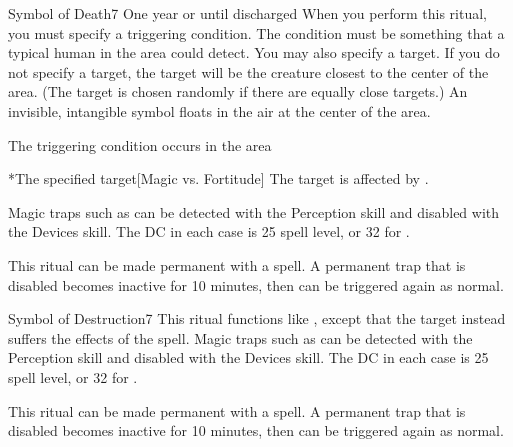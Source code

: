 \begin{spellsection}{Symbol of Death}{7}
\spelldur One year or until discharged
\spellspecial When you perform this ritual, you must specify a triggering condition. The condition must be something that a typical human in the area could detect. You may also specify a target. If you do not specify a target, the target will be the creature closest to the center of the area. (The target is chosen randomly if there are equally close targets.)
\spellline
\spelleffect An invisible, intangible symbol floats in the air at the center of the area.
\begin{spelltrigger}{The triggering condition occurs in the area}
    \begin{spelltarget}*{The specified target}[Magic vs. Fortitude]
        \spellsuccess The target is affected by .
    \end{spelltarget}
\end{spelltrigger}

\spellnotes Magic traps such as  can be detected with the Perception skill and disabled with the Devices skill. The DC in each case is 25 \add spell level, or 32 for .
\par This ritual can be made permanent with a  spell. A permanent trap that is disabled becomes inactive for 10 minutes, then can be triggered again as normal.
\end{spellsection}

\begin{spellsection}{Symbol of Destruction}{7}
\spellspecial This ritual functions like , except that the target instead suffers the effects of the  spell.
\spellnotes Magic traps such as  can be detected with the Perception skill and disabled with the Devices skill. The DC in each case is 25 \add spell level, or 32 for .
\par This ritual can be made permanent with a  spell. A permanent trap that is disabled becomes inactive for 10 minutes, then can be triggered again as normal.
\end{spellsection}

